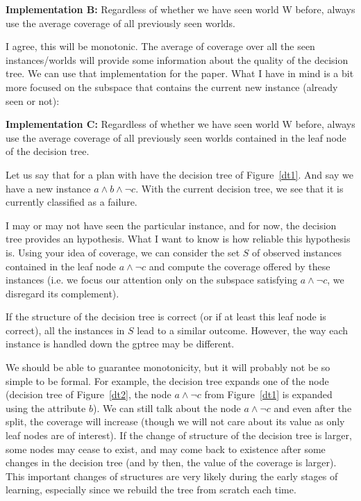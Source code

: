 \documentclass[10pt,a4paper]{article}
\begin{document}
{\bf Implementation B:} Regardless of whether we have seen world W
before, always use the average coverage of all previously seen worlds.

I agree, this will be monotonic. The average of coverage over all the
seen instances/worlds will provide some information about the quality
of the decision tree.  We can use that implementation for the paper.
What I have in mind is a bit more focused on the subspace that
contains the current new instance (already seen or not):

{\bf Implementation C:} Regardless of whether we have seen world W
before, always use the average coverage of all previously seen worlds
contained in the leaf node of the decision tree.

Let us say that for a plan with have the decision tree of
Figure~\ref{dt1}. And say we have a new instance $a \land b \land
\lnot c$. With the current decision tree, we see that it is currently
classified as a failure. 

I may or may not have seen the particular instance, and for now, the
decision tree provides an hypothesis.  What I want to know is how
reliable this hypothesis is. Using your idea of coverage, we can
consider the set $S$ of observed instances contained in the leaf node
$a \land \lnot c$ and compute the coverage offered by these instances
(i.e. we focus our attention only on the subspace satisfying $a \land
\lnot c$, we disregard its complement).

If the structure of the decision tree is correct (or if at least this
leaf node is correct), all the instances in $S$ lead to a similar
outcome. However, the way each instance is handled down the gptree may
be different. 

We should be able to guarantee monotonicity, but it will probably not
be so simple to be formal.  For example, the decision tree expands one
of the node (decision tree of Figure~\ref{dt2}, the node $a \land
\lnot c$ from Figure~\ref{dt1} is expanded using the attribute
$b$). We can still talk about the node $a \land \lnot c$ and even
after the split, the coverage will increase (though we will not care
about its value as only leaf nodes are of interest). If the change of
structure of the decision tree is larger, some nodes may cease to
exist, and may come back to existence after some changes in the
decision tree (and by then, the value of the coverage is larger).
This important changes of structures are very likely during the early
stages of learning, especially since we rebuild the tree from scratch
each time.
\end{document}
